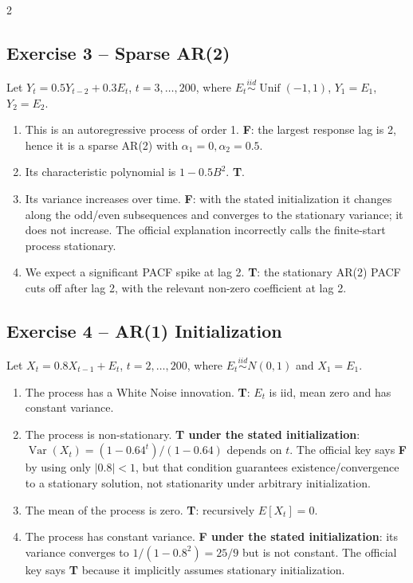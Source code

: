\documentclass[9pt,a4paper]{extarticle}
\begin{document}
\begin{multicols}{2}
\subsection*{Exercise 3 -- Sparse AR(2)}
Let \(Y_t=0.5Y_{t-2}+0.3E_t\), \(t=3,\ldots,200\), where \(E_t\stackrel{iid}{\sim}\operatorname{Unif}(-1,1)\), \(Y_1=E_1\), \(Y_2=E_2\).
\begin{enumerate}[label=\alph*),leftmargin=4mm]
\item This is an autoregressive process of order 1. \textbf{F}: the largest response lag is 2, hence it is a sparse AR(2) with \(\alpha_1=0,\alpha_2=0.5\).
\item Its characteristic polynomial is \(1-0.5B^2\). \textbf{T}.
\item Its variance increases over time. \textbf{F}: with the stated initialization it changes along the odd/even subsequences and converges to the stationary variance; it does not increase. The official explanation incorrectly calls the finite-start process stationary.
\item We expect a significant PACF spike at lag 2. \textbf{T}: the stationary AR(2) PACF cuts off after lag 2, with the relevant non-zero coefficient at lag 2.
\end{enumerate}

\subsection*{Exercise 4 -- AR(1) Initialization}
Let \(X_t=0.8X_{t-1}+E_t\), \(t=2,\ldots,200\), where \(E_t\stackrel{iid}{\sim}N(0,1)\) and \(X_1=E_1\).
\begin{enumerate}[label=\alph*),leftmargin=4mm]
\item The process has a White Noise innovation. \textbf{T}: \(E_t\) is iid, mean zero and has constant variance.
\item The process is non-stationary. \textbf{T under the stated initialization}: \(\operatorname{Var}(X_t)=(1-0.64^t)/(1-0.64)\) depends on \(t\). The official key says \textbf{F} by using only \(|0.8|<1\), but that condition guarantees existence/convergence to a stationary solution, not stationarity under arbitrary initialization.
\item The mean of the process is zero. \textbf{T}: recursively \(E[X_t]=0\).
\item The process has constant variance. \textbf{F under the stated initialization}: its variance converges to \(1/(1-0.8^2)=25/9\) but is not constant. The official key says \textbf{T} because it implicitly assumes stationary initialization.
\end{enumerate}


\end{multicols}
\end{document}

